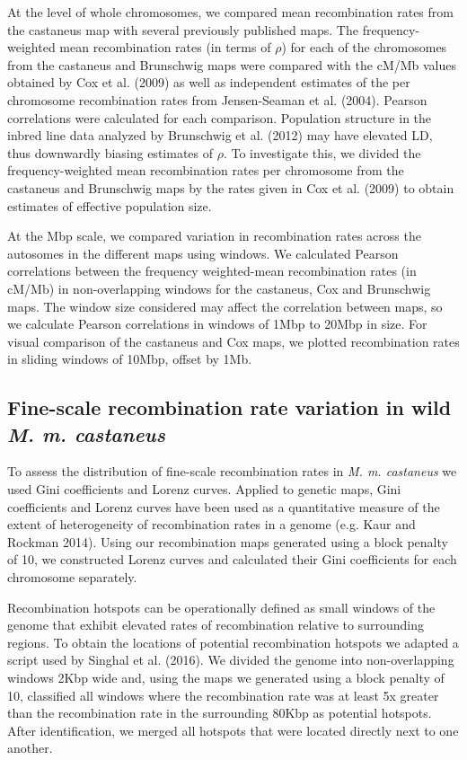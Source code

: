 At the level of whole chromosomes, we compared mean recombination rates from the castaneus map with several previously published maps. The frequency-weighted mean recombination rates (in terms of $\rho$) for each of the chromosomes from the castaneus and Brunschwig maps were compared with the cM/Mb values obtained by Cox et al. (2009) as well as independent estimates of the per chromosome recombination rates from Jensen-Seaman et al. (2004). Pearson correlations were calculated for each comparison. Population structure in the inbred line data analyzed by Brunschwig et al. (2012) may have elevated LD, thus downwardly biasing estimates of $\rho$. To investigate this, we divided the frequency-weighted mean recombination rates per chromosome from the castaneus and Brunschwig maps by the rates given in Cox et al. (2009) to obtain estimates of effective population size.
 
At the Mbp scale, we compared variation in recombination rates across the autosomes in the different maps using windows. We calculated Pearson correlations between the frequency weighted-mean recombination rates (in cM/Mb) in non-overlapping windows for the castaneus, Cox and Brunschwig maps. The window size considered may affect the correlation between maps, so we calculate Pearson correlations in windows of 1Mbp to 20Mbp in size. For visual comparison of the castaneus and Cox maps, we plotted recombination rates in sliding windows of 10Mbp, offset by 1Mb. 

\subsection{Fine-scale recombination rate variation in wild \emph{M. m. castaneus}}

To assess the distribution of fine-scale recombination rates in \emph{M. m. castaneus} we used Gini coefficients and Lorenz curves. Applied to genetic maps, Gini coefficients and Lorenz curves have been used as a quantitative measure of the extent of heterogeneity of recombination rates in a genome (e.g. Kaur and Rockman 2014). Using our recombination maps generated using a block penalty of 10, we constructed Lorenz curves and calculated their Gini coefficients for each chromosome separately.

	Recombination hotspots can be operationally defined as small windows of the genome that exhibit elevated rates of recombination relative to surrounding regions. To obtain the locations of potential recombination hotspots we adapted a script used by Singhal et al. (2016). We divided the genome into non-overlapping windows 2Kbp wide and, using the maps we generated using a block penalty of 10, classified all windows where the recombination rate was at least 5x greater than the recombination rate in the surrounding 80Kbp as potential hotspots. After identification, we merged all hotspots that were located directly next to one another.

